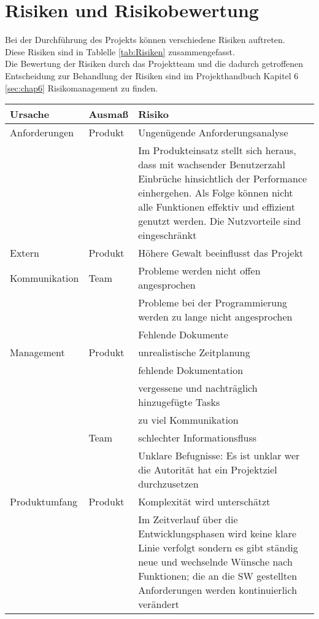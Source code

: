 \chapter{Risiken und Risikobewertung}
Bei der Durchführung des Projekts können verschiedene Risiken auftreten. \\
Diese Risiken sind in Tablelle \ref{tab:Risiken} zusammengefasst. \\
Die Bewertung der Risiken durch das Projektteam und die dadurch getroffenen Entscheidung zur Behandlung der Risiken sind im Projekthandbuch Kapitel 6 \ref{sec:chap6} Risikomanagement zu finden.
\begin{table}
\centering
\scriptsize
\begin{tabularx}{\textwidth}{|l|l|X|} 
\hline
\textbf{Ursache} & \textbf{Ausmaß} & \textbf{Risiko} \\
\hline
Anforderungen & Produkt & Ungenügende Anforderungsanalyse  \\ 
\hline
 &  & Im Produkteinsatz stellt sich heraus, dass mit wachsender Benutzerzahl Einbrüche hinsichtlich der Performance einhergehen. Als Folge können nicht alle Funktionen effektiv und effizient genutzt werden. Die Nutzvorteile sind eingeschränkt  \\ 
\hline
Extern & Produkt & Höhere Gewalt beeinflusst das Projekt  \\ 
\hline
Kommunikation & Team & Probleme werden nicht offen angesprochen \\ 
\hline
 &  & Probleme bei der Programmierung werden zu lange nicht angesprochen \\ 
\hline
 &  & Fehlende Dokumente\\ 
\hline
Management & Produkt & unrealistische Zeitplanung \\ 
\hline
 &  & fehlende Dokumentation \\ 
\hline
 &  & vergessene und nachträglich hinzugefügte Tasks \\ 
\hline
 &  & zu viel Kommunikation\\ 
\hline
 & Team & schlechter Informationsfluss \\ 
\hline
 &  & Unklare Befugnisse: Es ist unklar wer die Autorität hat ein Projektziel durchzusetzen  \\ 
\hline
Produktumfang & Produkt & Komplexität wird unterschätzt \\ 
\hline
 &  & Im Zeitverlauf über die Entwicklungsphasen wird keine klare Linie verfolgt sondern es gibt ständig neue und wechselnde Wünsche nach Funktionen; die an die SW gestellten Anforderungen werden kontinuierlich verändert\\ 

\end{tabularx}
\end{table}
